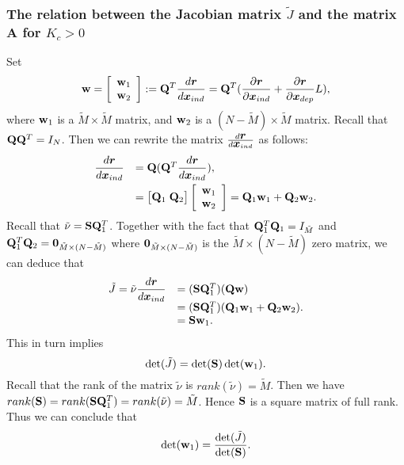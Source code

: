 \documentclass[ amsmath,amssymb,nofootinbib
]{revtex4-1}
\def\mbf#1{\mbox{\boldmath $#1$}}
\newcommand{\be}{\begin{equation}}
\newcommand{\ee}{\end{equation}}
\newcommand{\bQ}{{\bf Q}}
\newcommand{\bS}{{\bf S}}
\newcommand{\bw}{{\bf w}}
\newcommand{\bx}{{\mbf x}}
\newcommand{\br}{{\mbf r}}
\newcommand{\tM}{{\tilde M}}
\newcommand{\tnu}{{\tilde \nu}}
\newcommand{\tJ}{{\tilde J}}
\newcommand{\p}{\partial}
\begin{document}
\subsubsection{The relation between the Jacobian matrix $\tJ$ and the matrix {\bf A}  for $K_c >0$}  \label{sec:app_1.4}

Set
\be \label{e:bw}
    \bw = \left[\begin{array}{c}
                      \bw_1 \\
                      \bw_2\\
                    \end{array}\right]
                    :=  \bQ^T \frac{d \br}{d \bx_{ind}} \\
                    = \bQ^T  (\frac{\p \br }{\p {\mbf x}_{ind}}+\frac{\p \br }{\p {\mbf x}_{dep}}L),
\ee
where
$\bw_1$ is a $\tM \times \tM$ matrix, and $\bw_2$ is a $ (N - \tM) \times \tM$ matrix.
Recall that $\bQ \bQ^T =I_N$.
Then we can rewrite the  matrix $ \frac{d \br}{d \bx_{ind}} $ as follows:
\be
\begin{array}{ll}
   \dfrac{d \br}{d \bx_{ind}}  &= \bQ (\bQ^T \dfrac{d \br}{d \bx_{ind}}),  \\ [2ex]
 &%
     =  \big[\bQ_1  \;  \bQ_2\big]
      \left[\begin{array}{c}
                      \bw_1 \\
                      \bw_2\\
                    \end{array}\right] = \bQ_1\bw_1 + \bQ_2\bw_2.
\end{array}
\ee
Recall that $\tnu = \bS \bQ_1^T$.
Together with the fact that $\bQ_1^T \bQ_1 =I_\tM$
and $\bQ_1^T \bQ_2  = {\bf 0}_{\tM \times (N - \tM)}$
where ${\bf 0}_{\tM \times (N - \tM)}$ is the $\tM \times (N - \tM)$ zero matrix,
we can deduce that
\be
\begin{array}{ll}
 \tJ =   \tnu \dfrac{d \br}{d \bx_{ind}}  &= (\bS \bQ_1^T) (\bQ\bw)  \\
         &= (\bS \bQ_1^T) (\bQ_1\bw_1 + \bQ_2\bw_2). \\
         &= \bS \bw_1.
\end{array}
\ee
This in turn implies
$$
    \det(\tJ) =  \det(\bS) \det(\bw_1).
$$
Recall that the rank of the matrix $\tnu$ is $rank(\tnu) = \tM$.
Then we have $rank(\bS) = rank(\bS \bQ_1^T) = rank(\tnu) = \tM$.
Hence $\bS$ is a square matrix of full rank.
Thus we can conclude that
\be \label{c:df}
           \det(\bw_1) = \frac{\det(\tJ)}{\det(\bS)}.
\ee
%
\end{document}
